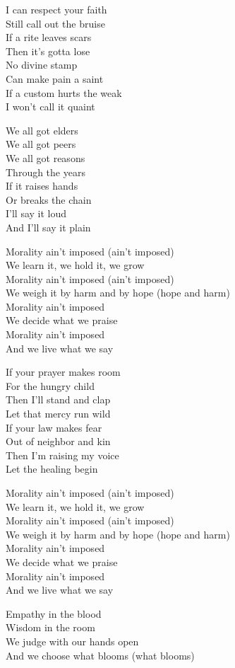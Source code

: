 \begin{lyrics}
I can respect your faith\\
Still call out the bruise\\
If a rite leaves scars\\
Then it’s gotta lose\\
No divine stamp\\
Can make pain a saint\\
If a custom hurts the weak\\
I won’t call it quaint

We all got elders\\
We all got peers\\
We all got reasons\\
Through the years\\
If it raises hands\\
Or breaks the chain\\
I’ll say it loud\\
And I’ll say it plain

Morality ain’t imposed (ain’t imposed)\\
We learn it, we hold it, we grow\\
Morality ain’t imposed (ain’t imposed)\\
We weigh it by harm and by hope
(hope and harm)\\
Morality ain’t imposed\\
We decide what we praise\\
Morality ain’t imposed\\
And we live what we say

If your prayer makes room\\
For the hungry child\\
Then I’ll stand and clap\\
Let that mercy run wild\\
If your law makes fear\\
Out of neighbor and kin\\
Then I’m raising my voice\\
Let the healing begin

Morality ain’t imposed (ain’t imposed)\\
We learn it, we hold it, we grow\\
Morality ain’t imposed (ain’t imposed)\\
We weigh it by harm and by hope
(hope and harm)\\
Morality ain’t imposed\\
We decide what we praise\\
Morality ain’t imposed\\
And we live what we say

Empathy in the blood\\
Wisdom in the room\\
We judge with our hands open\\
And we choose what blooms
(what blooms)
\end{lyrics}


